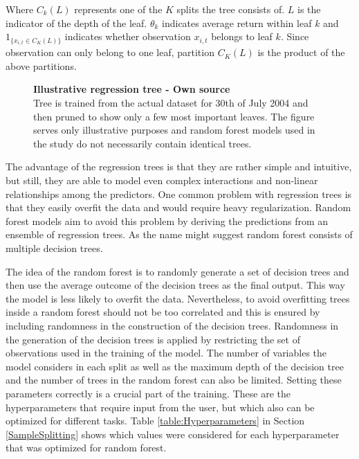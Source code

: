 \documentclass[12pt]{article}
\begin{document}
Where $C_k(L)$ represents one of the $K$ splits the tree consists of. $L$ is the indicator of the depth of the leaf. $\theta_k$ indicates average return within leaf $k$ and $1 _{\{x_{i, t} \in C_K(L)\}}$ indicates whether observation $x_{i, t}$ belongs to leaf $k$.\footnotemark {}  Since observation can only belong to one leaf, partition $C_K(L)$ is the product of the above partitions. \par

\begin{figure}[ht]
\centering
\caption[Illustrative regression tree]{\textbf{Illustrative regression tree \textnormal{- Own source}}\\ Tree is trained from the actual dataset for 30th of July 2004 and then pruned to show only a few most important leaves. The figure serves only illustrative purposes and random forest models used in the study do not necessarily contain identical trees. }

\label{plot:regre_tree}
\end{figure}

The advantage of the regression trees is that they are rather simple and intuitive, but still, they are able to model even complex interactions and non-linear relationships among the predictors. One common problem with regression trees is that they easily overfit the data and would require heavy regularization. Random forest models aim to avoid this problem by deriving the predictions from an ensemble of regression trees. As the name might suggest random forest consists of multiple decision trees. \par

The idea of the random forest is to randomly generate a set of decision trees and then use the average outcome of the decision trees as the final output. This way the model is less likely to overfit the data. Nevertheless, to avoid overfitting trees inside a random forest should not be too correlated and this is ensured by including randomness in the construction of the decision trees. Randomness in the generation of the decision trees is applied by restricting the set of observations used in the training of the model. The number of variables the model considers in each split as well as the maximum depth of the decision tree and the number of trees in the random forest can also be limited. Setting these parameters correctly is a crucial part of the training. These are the hyperparameters that require input from the user, but which also can be optimized for different tasks. Table \ref{table:Hyperparameters} in Section \ref{SampleSplitting} shows which values were considered for each hyperparameter that was optimized for random forest. \par
\end{document}
